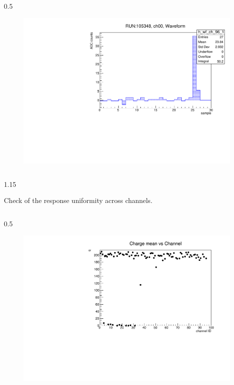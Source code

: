 \documentclass{beamer}
\begin{document}
\begin{frame}
\begin{columns}
\begin{column}{0.5\framewidth}
\begin{figure}[!h]
    \includegraphics[width=0.95\columnwidth]{figures/pdf/glitch.pdf}
         \label{fig:normalhits}
    \end{figure}
    \end{column}
    \end{columns}
    \vspace{-3mm}
        \begin{columns}
        \begin{column}{1.15\framewidth}
            \setlength{\leftmargini}{1.em}
          \begin{itemize}
     {\small
    \item Check of the response uniformity
    across channels.}
    \end{itemize}
    \end{column}
    \end{columns}
    \vspace{-3mm}
    \begin{columns}
    \begin{column}{0.5\framewidth}
             \begin{figure}[!h]
          \centering
          \hspace*{-1em}
          \includegraphics[width=1.\columnwidth]{figures/pdf/q_vs_ch1.pdf}

\end{figure}
\end{column}
\end{columns}
\end{frame}
\end{document}
